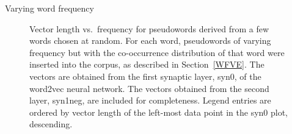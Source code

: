 \documentclass{article} %
\begin{document}
\begin{section}{Varying word frequency}
\begin{figure}
	\caption{ Vector length vs.\ frequency for pseudowords derived from a
          few words chosen at random.  For each word, pseudowords of varying
          frequency but with the co-occurrence distribution of that word
          were inserted into the corpus, as described in
          Section~\ref{WFVE}.  The vectors are obtained from the first
          synaptic layer, syn0, of the word2vec neural network.  The
          vectors obtained from the second layer, syn1neg, are included
          for completeness.  Legend entries are ordered by vector length
          of the left-most data point in the syn0 plot, descending.}
	\label{fig:word-frequency-experiment-graph}
\end{figure}
\end{section}
\end{document}
